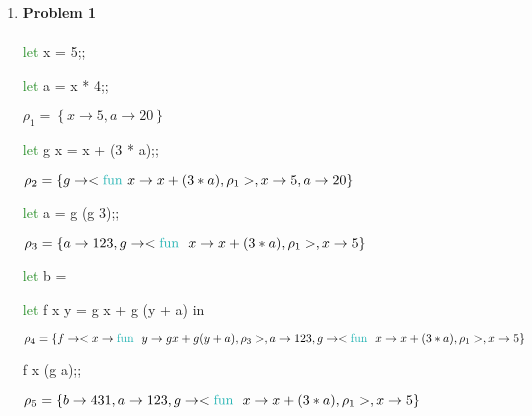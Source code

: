 
\usepackage{algorithm}
\usepackage{listings}
\usepackage{graphicx,amssymb,amsmath}
\usepackage{epstopdf}
\usepackage{color}
\usepackage[dvipsnames]{xcolor}
\sloppy

\oddsidemargin 0in
\evensidemargin 0in
\textwidth 6.5in
\topmargin -0.5in
\textheight 9.0in




\pagestyle{myheadings}  %
	 	
\begin{enumerate}	
\item{\bf{Problem 1}} \\ \\
\textcolor{ForestGreen}{let} x = 5;;

\textcolor{ForestGreen}{let} a = x * 4;;

\(\rho_1 = \left\{ x \rightarrow 5, a \rightarrow 20 \right\} \)

\textcolor{ForestGreen}{let} g x = x + (3 * a);; 

\(\rho_2 = \left\{ g \rightarrow  < \text{\textcolor{TealBlue}{fun }} x \rightarrow x + (3 * a), \rho_1>, x \rightarrow 5, a \rightarrow 20 \right\} \)

\textcolor{ForestGreen}{let} a = g (g 3);;

\(\rho_3 = \left\{ a \rightarrow 123, g \rightarrow  < \text{\text{\textcolor{TealBlue}{fun }} } x \rightarrow x + (3 * a), \rho_1>, x \rightarrow 5 \right\}  \)

\textcolor{ForestGreen}{let} b =

\hspace{5mm} \textcolor{ForestGreen}{let} f x y = g x + g (y + a) in 

\(\rho_4 = \left\{ f \rightarrow < x \rightarrow \text{\text{\textcolor{TealBlue}{fun }} } y \rightarrow g x + g (y + a), \rho_3>, a \rightarrow 123, g \rightarrow  < \text{\text{\textcolor{TealBlue}{fun }} } x \rightarrow x + (3 * a), \rho_1>, x \rightarrow 5 \right\} \)

\hspace{5mm} f x (g a);;

\(\rho_5 =  \left\{ b \rightarrow 431, a \rightarrow 123, g \rightarrow  < \text{\text{\textcolor{TealBlue}{fun }} } x \rightarrow x + (3 * a), \rho_1>, x \rightarrow 5 \right\}  \)

\end{enumerate}



